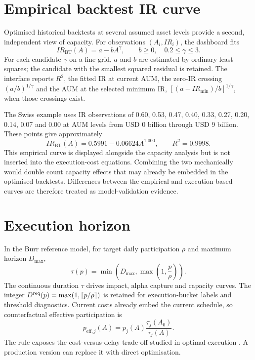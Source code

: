 \documentclass[11pt,a4paper]{article}
\numberwithin{equation}{section}
\begin{document}
\section{Empirical backtest IR curve}
Optimised historical backtests at several assumed asset levels provide a second, independent view
of capacity. For observations $(A_i,IR_i)$, the dashboard fits
\begin{equation}\label{eq:backtestir}
 IR_{\mathrm{BT}}(A)=a-bA^\gamma,\qquad b\geq0,\quad 0.2\leq\gamma\leq3.
\end{equation}
For each candidate $\gamma$ on a fine grid, $a$ and $b$ are estimated by ordinary least squares;
the candidate with the smallest squared residual is retained. The interface reports $R^2$, the
fitted IR at current AUM, the zero-IR crossing $(a/b)^{1/\gamma}$ and the AUM at the selected
minimum IR, $[(a-IR_{\min})/b]^{1/\gamma}$, when those crossings exist.

The Swiss example uses IR observations of 0.60, 0.53, 0.47, 0.40, 0.33, 0.27, 0.20, 0.14,
0.07 and 0.00 at AUM levels from USD 0 billion through USD 9 billion. These points give
approximately
\begin{equation}\label{eq:backtestirexample}
 IR_{\mathrm{BT}}(A)=0.5991-0.06624A^{1.000},\qquad R^2=0.9998.
\end{equation}
This empirical curve is displayed alongside the capacity analysis but is not inserted into the
execution-cost equations. Combining the two mechanically would double count capacity effects that
may already be embedded in the optimised backtests. Differences between the empirical and
execution-based curves are therefore treated as model-validation evidence.

\section{Execution horizon}
In the Burr reference model, for target daily participation $\rho$ and maximum horizon $D_{\max}$,
\begin{equation}\label{eq:days}
 \tau(p)=\min\!\left(D_{\max},\max\!\left(1,\frac{p}{\rho}\right)\right).
\end{equation}
The continuous duration $\tau$ drives impact, alpha capture and capacity curves. The integer
$D^{\rm req}(p)=\max(1,\lceil p/\rho\rceil)$ is retained for execution-bucket labels and threshold
diagnostics.
Current costs already embed the current schedule, so counterfactual effective participation is
\begin{equation}\label{eq:effective}
 p_{\mathrm{eff},j}(A)=p_j(A)\frac{\tau_j(A_0)}{\tau_j(A)}.
\end{equation}
The rule exposes the cost-versus-delay trade-off studied in optimal execution
\cite{almgren2001}. A production version can replace it with direct optimisation.
\end{document}
